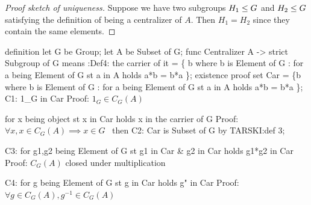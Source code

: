 \begin{proof}[Proof sketch of uniqueness]
Suppose we have two subgroups $H_{1}\leq G$ and $H_{2}\leq G$
satisfying the definition of being a centralizer of $A$.
Then $H_{1}=H_{2}$ since they contain the same elements.
\end{proof}

\nwenddocs{}\endmoddef\nwstartdeflinemarkup{}\nwenddeflinemarkup
definition
  let G be Group;
  let A be Subset of G;
  func Centralizer A -> strict Subgroup of G means
  :Def4:
  the carrier of it = \{ b where b is Element of G :
                        for a being Element of G st a in A holds a*b = b*a \};
  existence
  proof
    set Car = \{b where b is Element of G :
               for a being Element of G st a in A holds a*b = b*a \};
    C1: 1_G in Car
    \LA{}Proof: $1_{G}\in C_{G}(A)$~{\nwtagstyle{}}\RA{}

    for x being object st x in Car holds x in the carrier of G
    \LA{}Proof: $\forall x, x\in C_{G}(A)\implies x\in G$~{\nwtagstyle{}}\RA{}
    then C2: Car is Subset of G by TARSKI:def 3;

    C3: for g1,g2 being Element of G st g1 in Car & g2 in Car
    holds g1*g2 in Car
    \LA{}Proof: $C_{G}(A)$ closed under multiplication~{\nwtagstyle{}}\RA{}

    C4: for g being Element of G st g in Car holds g" in Car
    \LA{}Proof: $\forall g\in C_{G}(A), g^{-1}\in C_{G}(A)$~{\nwtagstyle{}}\RA{}

